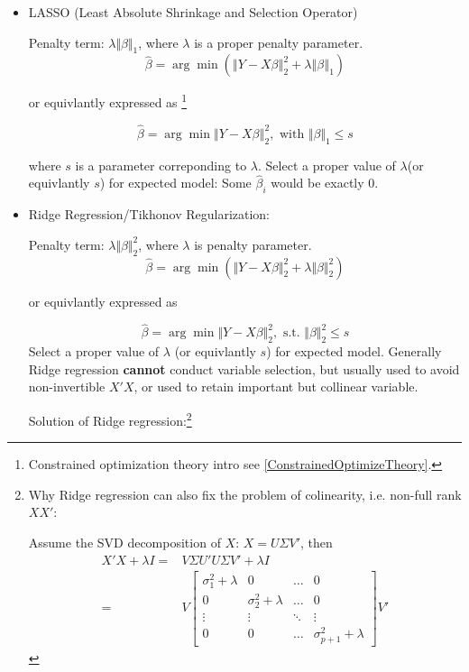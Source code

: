 \begin{itemize}[topsep=2pt,itemsep=2pt]  
\item LASSO (Least Absolute Shrinkage and Selection Operator)
     
Penalty term: $ \lambda\Vert \beta \Vert _1 $, where $ \lambda  $ is a proper penalty parameter.
\begin{equation}
    \hat{\beta }=\arg\min (\left\Vert Y-X\beta \right\Vert _2 ^2+\lambda\left\Vert \beta \right\Vert _1)
\end{equation}

    or equivlantly expressed as \footnote{Constrained optimization theory intro see \autoref{ConstrainedOptimizeTheory}.}

\begin{equation}
    \hat{\beta }=\arg\min \left\Vert Y-X\beta \right\Vert _2 ^2, \text{ with }\Vert \beta \Vert _1\leq s
\end{equation}

where $ s $ is a parameter correponding to $ \lambda  $. Select a proper value of $ \lambda  $(or equivlantly $ s $) for expected model: Some $ \hat{\beta }_i $ would be exactly $ 0 $.



\item Ridge Regression/Tikhonov Regularization:

Penalty term: $ \lambda\Vert \beta \Vert _2^2 $, where $ \lambda  $ is penalty parameter.
\begin{equation}
    \hat{\beta }=\arg\min (\Vert Y-X\beta \Vert _2 ^2+\lambda\Vert \beta \Vert _2^2)
\end{equation}

    or equivlantly expressed as 

\begin{equation}
    \hat{\beta }=\arg\min \Vert Y-X\beta \Vert _2 ^2, \text{ s.t. }\Vert \beta \Vert ^2_2\leq s
\end{equation}
Select a proper value of $ \lambda  $ (or equivlantly $ s $) for expected model. Generally Ridge regression \textbf{cannot} conduct variable selection, but usually used to avoid non-invertible $ X'X $, or used to retain important but collinear variable.

Solution of Ridge regression:\footnote{Why Ridge regression can also fix the problem of colinearity, i.e. non-full rank $ XX' $:

Assume the SVD decomposition of $ X $: $ X=U\Sigma V' $, then 
\begin{align}
    X'X+\lambda I=&V\Sigma U'U\Sigma V'+\lambda I\\
    =& V \begin{bmatrix}
    \sigma^2 _{1}+\lambda &0&\ldots&0\\
    0&\sigma^2 _{2}+\lambda &\ldots&0\\
    \vdots&\vdots&\ddots&\vdots\\
    0&0&\ldots&\sigma^2 _{p+1}+\lambda 
    \end{bmatrix}V'
\end{align}

}
\end{itemize}
